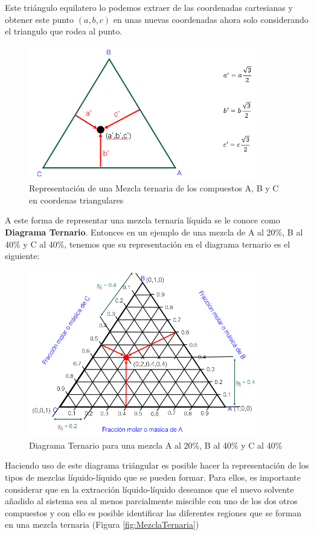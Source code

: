 \documentclass[11pt]{book}
\begin{document}
Este triángulo equilatero lo podemos extraer de las coordenadas cartesianas y obtener este punto $(a,b,c)$ en unas nuevas coordenadas ahora solo considerando el triangulo que rodea al punto.

\begin{figure}[H]
    \centering
    \includegraphics[width = 10cm]{img/LiquidoLiquido/MezclaTresCompuestos_3.PNG}
    \caption{Representación de una Mezcla ternaria de los compuestos A, B y C en coordenas triangulares}
    \label{fig:MezclaTresCompuestos_3}
\end{figure}

A este forma de representar una mezcla ternaria líquida se le conoce como \textbf{Diagrama Ternario}. Entonces en un ejemplo de una mezcla de A al 20\%, B al 40\% y C al 40\%, tenemos que su representación en el diagrama ternario es el siguiente:

\begin{figure}[H]
    \centering
    \includegraphics[width = 10cm]{img/LiquidoLiquido/DiagramaTriangular.PNG}
    \caption{Diagrama Ternario para una mezcla A al 20\%, B al 40\% y C al 40\%}
    \label{fig:DiagramaTriangular}
\end{figure}

Haciendo uso de este diagrama triángular es posible hacer la representación de los tipos de mezclas líquido-líquido que se pueden formar. Para ellos, es importante considerar que en la extracción líquido-líquido deseamos que el nuevo solvente añadido al sistema sea al menos parcialmente miscible con uno de los dos otros compuestos y con ello es posible identificar las diferentes regiones que se forman en una mezcla ternaria (Figura \ref{fig:MezclaTernaria})
\end{document}
